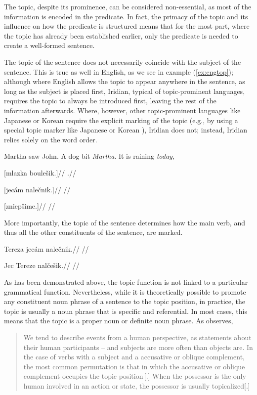 The topic, despite its prominence, can be considered non-essential, as most of the information is encoded in the predicate. In fact, the primacy of the topic and its influence on how the predicate is structured means that for the most part, where the topic has already been established earlier, only the predicate is needed to create a well-formed sentence. 

The topic of the sentence does not necessarily coincide with the subject of the sentence. This is true as well in English, as we see in example (\ref{ex:engtop}); although where English allows the topic to appear anywhere in the sentence, as long as the subject is placed first, Iridian, typical of topic-prominent languages, requires the topic to always be introduced first, leaving the rest of the information afterwards. Where, however, other topic-prominent languages like Japanese or Korean require the explicit marking of the topic (e.g., by using a special topic marker like Japanese  or Korean ), Iridian does not; instead, Iridian relies solely on the word order.

\pex\label{ex:engtop}
\a Martha saw John.
\a A dog bit \emph{Martha}.
\a It is raining \emph{today},
\xe

\pex
\a
\begingl
\gla \relax[Janek] [mlazka boulešik.]//
\glft {}.//
\endgl

\a
\begingl
\gla \relax[Tereza] [jecám nalečnik.]//
\glft {}//
\endgl

\a
\begingl
\gla \relax[Shléd] [zniepšime.]//
\glft {}//
\endgl
\xe

More importantly, the topic of the sentence determines how the main verb, and thus all the other constituents of the sentence, are marked.

\pex
\a
\begingl
\gla Tereza jec{ám} naleč{n}ik.//
\glft {}//
\endgl

\a
\begingl
\gla Jec Terez{e} nalč{eš}ik.//
\glft {}//
\endgl
\xe

As has been demonstrated above, the topic function is not linked to a particular grammatical function. Nevertheless, while it is theoretically possible to promote any constituent noun phrase of a sentence to the topic position, in practice, the topic is usually a noun phrase that is specific and referential. In most cases, this means that the topic is a proper noun or definite noun phrase. As \textcite{kiss2004} observes,
\begin{quote}
  We tend to describe events from a human perspective, as statements about their human participants – and subjects are more often {\sc[+human]} than objects are. In the case of verbs with a {\sc[–human]} subject and a {\sc[+human]} accusative or oblique complement,  the  most  common  permutation  is  that  in  which  the  accusative  or oblique complement occupies the topic position\,[.] When the possessor is the only human involved in an action or state, the possessor is usually topicalized[.]
\end{quote}

